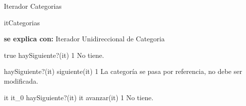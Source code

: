 \begin{interfaz}{Iterador Categorias}
\begin{iparamformales}{itCategorias}


\textbf{\large se explica con:} Iterador Unidireccional de Categoria

\end{iparamformales}

{true}
{\igres haySiguiente?(it)}
{1}
{No tiene.}

{haySiguiente?(it)}
{\igres siguiente(it)}
{1}
{La categoría se pasa por referencia, no debe ser modificada.}

{it \igobs it_0 \land haySiguiente?(it)}
{it \igobs avanzar(it)}
{1}
{No tiene.}

\end{interfaz}